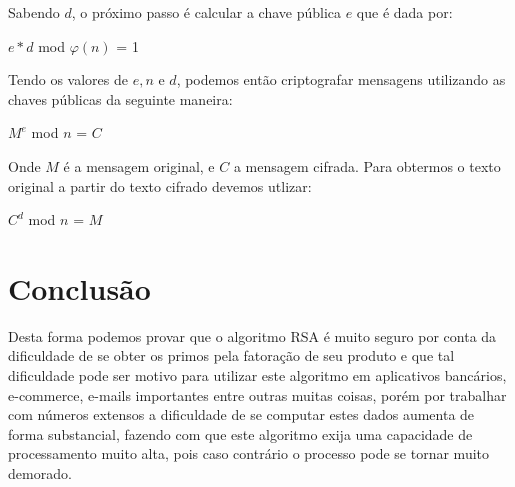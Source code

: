 \documentclass[12pt]{article}
\begin{document}
Sabendo $d$, o pr\'{o}ximo passo \'{e} calcular a chave p\'{u}blica $e$ que \'{e} dada por:
\begin{center}
$e * d$ mod $\varphi(n)$ = 1
\end{center}

Tendo os valores de $e, n$ e $d$, podemos ent\~{a}o criptografar mensagens utilizando as chaves p\'{u}blicas da seguinte maneira:
\begin{center}
$M^e$ mod $n$ = $C$
\end{center}
Onde $M$ \'{e} a mensagem original, e $C$ a mensagem cifrada. Para obtermos o texto original a partir do texto cifrado devemos utlizar:
\begin{center}
$C^d$ mod $n$ = $M$
\end{center}
\section{Conclus\~{a}o}
Desta forma podemos provar que o algoritmo RSA \'{e} muito seguro por conta da dificuldade de se obter os primos pela fatora\c c\~{a}o de seu produto e que tal dificuldade pode ser motivo para utilizar este algoritmo em aplicativos banc\'{a}rios, e-commerce, e-mails importantes entre outras muitas coisas, por\'{e}m por trabalhar com n\'{u}meros extensos a dificuldade de se computar estes dados aumenta de forma substancial, fazendo com que este algoritmo exija uma capacidade de processamento muito alta, pois caso contr\'{a}rio o processo pode se tornar muito demorado.




\nocite{al-kadi:00}
\nocite{ufcg:02}
\nocite{oliveira2012criptografia}
\nocite{tech}
\nocite{ita}
\nocite{bruno}
\end{document}
